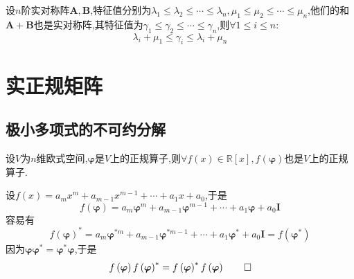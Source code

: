 \begin{formal}
    \begin{theorem}[Weyl摄动定理]\label{thm:Weyl摄动定理}
        设$n$阶实对称阵$\bm{A},\bm{B}$,特征值分别为$\lambda_1\leqslant\lambda_2\leqslant\cdots\leqslant\lambda_n,\mu_1\leqslant\mu_2\leqslant\cdots\leqslant\mu_n$,他们的和$\bm{A}+\bm{B}$也是实对称阵,其特征值为$\gamma_1\leqslant\gamma_2\leqslant\cdots\leqslant\gamma_n$,则$\forall 1\leqslant i\leqslant n:$\[
        \lambda_i+\mu_1\leqslant\gamma_i\leqslant\lambda_i+\mu_n
        \]
    \end{theorem}
\end{formal}
\newpage
\section{实正规矩阵}
\subsection{极小多项式的不可约分解}
\begin{green}
    \begin{lemma}[正规与多项式相容]\label{lem:正规与多项式相容}
        设$V$为$n$维欧式空间,$\bm{\varphi}$是$V$上的正规算子,则$\forall f\left(x\right)\in\mathbb{R}\left[x\right],f\left(\bm{\varphi}\right)$也是$V$上的正规算子.
    \end{lemma}
    \begin{Proof}
        设$f\left(x\right)=a_mx^m+a_{m-1}x^{m-1}+\cdots+a_1x+a_0$,于是\[
        f\left(
            \bm{\varphi}
        \right)=a_m\bm{\varphi}^m+a_{m-1}\bm{\varphi}^{m-1}+\cdots+a_1\bm{\varphi}+a_0\bm{I}
        \]容易有\[
        f\left(\bm{\varphi}\right)^*=a_m\bm{\varphi}^{*m}+a_{m-1}\bm{\varphi}^{*m-1}+\cdots+a_1\bm{\varphi}^*+a_0\bm{I}=f\left(
            \bm{\varphi}^*
        \right)
        \]因为$\bm{\varphi\varphi}^*=\bm{\varphi}^*\bm{\varphi}$,于是\[
        f\left(
            \bm{\varphi}
        \right)f\left(
            \bm{\varphi}
        \right)^*=f\left(
            \bm{\varphi}
        \right)^*f\left(
            \bm{\varphi}
        \right)\qedhere
        \]
    \end{Proof}
\end{green}
